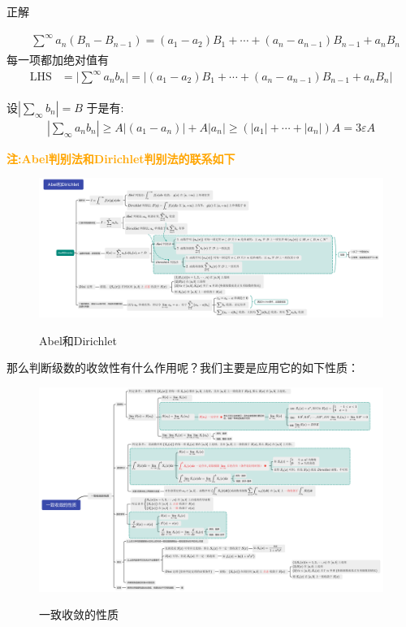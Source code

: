 \noindent\textsf{正解}\par
\begin{align*}
    &\sum_{}^{\infty}{a_n(B_n-B_{n-1})} 
        = (a_1-a_2)B_1+\cdots+(a_n-a_{n-1})B_{n-1}+a_nB_n
\end{align*}
每一项都加绝对值有
\begin{align*}
    \mathrm{LHS}
    & =\bigg|\sum_{}^{\infty}{a_nb_n}\bigg|
      =\bigg|(a_1-a_2)B_1+\cdots+(a_n-a_{n-1})B_{n-1}+a_nB_n\bigg|
\end{align*}

设\ensuremath{\displaystyle |\sum_{\infty}{b_n}|=B} 于是有:
\begin{align*}
    |\sum_{\infty}{a_nb_n}|\ge A|(a_1-a_n)|+A|a_n|
    \ge (|a_1|+\cdots+ |a_n|)A 
    = 3\varepsilon A
\end{align*}


\newpage
\textcolor{orange}{\textbf{注:Abel判别法和Dirichlet判别法的联系如下}}

\begin{figure}[!htb]
    \includegraphics[scale=0.30]{Chapter/TikZ/Abel和Dirichlet.pdf}
    \label{Abel和Dirichlet}
    \caption{Abel和Dirichlet}
\end{figure}

那么判断级数的收敛性有什么作用呢？我们主要是应用它的如下性质：\par
\begin{figure}[!htb]
    \includegraphics[scale=0.30]{Chapter/TikZ/一致收敛的性质.pdf}
    \label{一致收敛的性质}
    \caption{一致收敛的性质}
\end{figure}


